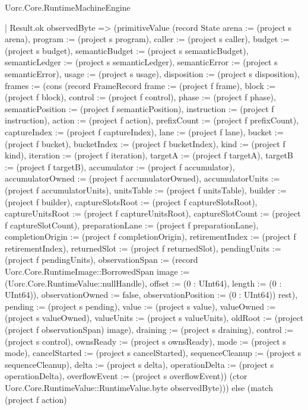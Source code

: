 \begin{lexlean}{Uorc.Core.RuntimeMachineEngine}
\begin{semanticmodule}
{      | Result.ok observedByte => (primitiveValue (record State {arena := (project s arena), program := (project s program), caller := (project s caller), budget := (project s budget), semanticBudget := (project s semanticBudget), semanticLedger := (project s semanticLedger), semanticError := (project s semanticError), usage := (project s usage), disposition := (project s disposition), frames := (cons (record FrameRecord {frame := (project f frame), block := (project f block), control := (project f control), phase := (project f phase), semanticPosition := (project f semanticPosition), instruction := (project f instruction), action := (project f action), prefixCount := (project f prefixCount), captureIndex := (project f captureIndex), lane := (project f lane), bucket := (project f bucket), bucketIndex := (project f bucketIndex), kind := (project f kind), iteration := (project f iteration), targetA := (project f targetA), targetB := (project f targetB), accumulator := (project f accumulator), accumulatorOwned := (project f accumulatorOwned), accumulatorUnits := (project f accumulatorUnits), unitsTable := (project f unitsTable), builder := (project f builder), captureSlotsRoot := (project f captureSlotsRoot), captureUnitsRoot := (project f captureUnitsRoot), captureSlotCount := (project f captureSlotCount), preparationLane := (project f preparationLane), completionOrigin := (project f completionOrigin), retirementIndex := (project f retirementIndex), returnedSlot := (project f returnedSlot), pendingUnits := (project f pendingUnits), observationSpan := (record Uorc.Core.RuntimeImage::BorrowedSpan {image := (Uorc.Core.RuntimeValue::nullHandle), offset := (0 : UInt64), length := (0 : UInt64)}), observationOwned := false, observationPosition := (0 : UInt64)}) rest), pending := (project s pending), value := (project s value), valueOwned := (project s valueOwned), valueUnits := (project s valueUnits), oldRoot := (project (project f observationSpan) image), draining := (project s draining), control := (project s control), ownsReady := (project s ownsReady), mode := (project s mode), cancelStarted := (project s cancelStarted), sequenceCleanup := (project s sequenceCleanup), delta := (project s delta), operationDelta := (project s operationDelta), overflowEvent := (project s overflowEvent)}) (ctor Uorc.Core.RuntimeValue::RuntimeValue.byte observedByte))) else (match (project f action)
}
\end{semanticmodule}
\end{lexlean}
